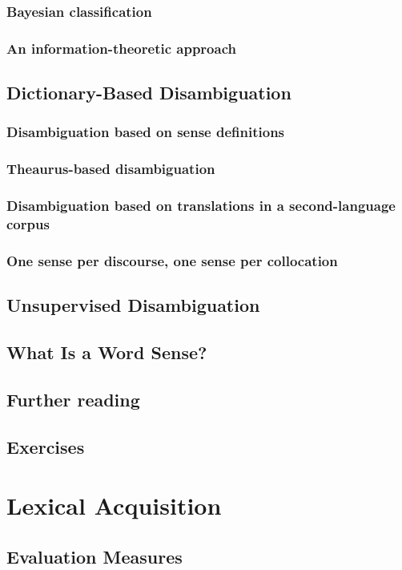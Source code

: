 \documentclass[a4paper]{article}
\begin{document}
\subsubsection{Bayesian classification}
\subsubsection{An information-theoretic approach}
\subsection{Dictionary-Based Disambiguation}
\subsubsection{Disambiguation based on sense definitions}
\subsubsection{Theaurus-based disambiguation}
\subsubsection{Disambiguation based on translations in a second-language corpus}
\subsubsection{One sense per discourse, one sense per collocation}
\subsection{Unsupervised Disambiguation}
\subsection{What Is a Word Sense?}
\subsection{Further reading}
\subsection{Exercises}
\newpage
\section{Lexical Acquisition}
\subsection{Evaluation Measures}
\end{document}
